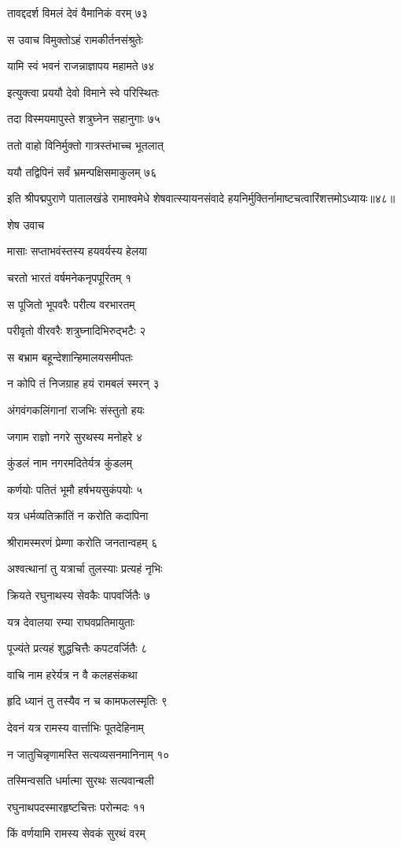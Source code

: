 तावद्ददर्श विमलं देवं वैमानिकं वरम् ७३

स उवाच विमुक्तोऽहं रामकीर्तनसंश्रुतेः

यामि स्वं भवनं राजन्नाज्ञापय महामते ७४

इत्युक्त्वा प्रययौ देवो विमाने स्वे परिस्थितः

तदा विस्मयमापुस्ते शत्रुघ्नेन सहानुगाः ७५

ततो वाहो विनिर्मुक्तो गात्रस्तंभाच्च भूतलात्

ययौ तद्विपिनं सर्वं भ्रमन्पक्षिसमाकुलम् ७६

इति श्रीपद्मपुराणे पातालखंडे रामाश्वमेधे शेषवात्स्यायनसंवादे हयनिर्मुक्तिर्नामाष्टचत्वारिंशत्तमोऽध्यायः॥४८॥


शेष उवाच

मासाः सप्ताभवंस्तस्य हयवर्यस्य हेलया

चरतो भारतं वर्षमनेकनृपपूरितम् १

स पूजितो भूपवरैः परीत्य वरभारतम्

परीवृतो वीरवरैः शत्रुघ्नादिभिरुद्भटैः २

स बभ्राम बहून्देशान्हिमालयसमीपतः

न कोपि तं निजग्राह हयं रामबलं स्मरन् ३

अंगवंगकलिंगानां राजभिः संस्तुतो हयः

जगाम राज्ञो नगरे सुरथस्य मनोहरे ४

कुंडलं नाम नगरमदितेर्यत्र कुंडलम्

कर्णयोः पतितं भूमौ हर्षभयसुकंपयोः ५

यत्र धर्मव्यतिक्रांतिं न करोति कदापिना

श्रीरामस्मरणं प्रेम्णा करोति जनतान्वहम् ६

अश्वत्थानां तु यत्रार्चा तुलस्याः प्रत्यहं नृभिः

क्रियते रघुनाथस्य सेवकैः पापवर्जितैः ७

यत्र देवालया रम्या राघवप्रतिमायुताः

पूज्यंते प्रत्यहं शुद्धचित्तैः कपटवर्जितैः ८

वाचि नाम हरेर्यत्र न वै कलहसंकथा

हृदि ध्यानं तु तस्यैव न च कामफलस्मृतिः ९

देवनं यत्र रामस्य वार्त्ताभिः पूतदेहिनाम्

न जातुचिन्नृणामस्ति सत्यव्यसनमानिनाम् १०

तस्मिन्वसति धर्मात्मा सुरथः सत्यवान्बली

रघुनाथपदस्मारहृष्टचित्तः परोन्मदः ११

किं वर्णयामि रामस्य सेवकं सुरथं वरम्

